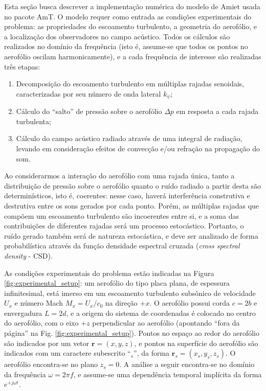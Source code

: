 \documentclass[a4paper, 11pt, twoside]{article}
\begin{document}
Esta seção busca descrever a implementação numérica do modelo de Amiet usada no pacote AmT. O modelo requer como entrada as condições experimentais do problema: as propriedades do escoamento turbulento, a geometria do aerofólio, e a localização dos observadores no campo acústico. Todos os cálculos são realizados no domínio da frequência (isto é, assume-se que todos os pontos no aerofólio oscilam harmonicamente), e a cada frequência de interesse são realizadas três etapas:

\begin{enumerate}
	\item Decomposição do escoamento turbulento em múltiplas rajadas senoidais, caracterizadas por seu número de onda lateral $k_\psi$;
	\item Cálculo do ``salto'' de pressão sobre o aerofólio $\Delta p$ em resposta a cada rajada turbulenta;
	\item Cálculo do campo acústico radiado através de uma integral de radiação, levando em consideração efeitos de convecção e/ou refração na propagação do som.
\end{enumerate}


Ao considerarmos a interação do aerofólio com uma rajada única, tanto a distribuição de pressão sobre o aerofólio quanto o ruído radiado a partir desta são determinísticos, isto é, coerentes: nesse caso, haverá interferência construtiva e destrutiva entre os sons gerados por cada ponto. Porém, as múltiplas rajadas que compõem um escoamento turbulento são incoerentes entre si, e a soma das contribuições de diferentes rajadas será um processo estocástico. Portanto, o ruído gerado também será de natureza estocástica, e deve ser analizado de forma probabilística através da função densidade espectral cruzada (\emph{cross spectral density} - CSD).

As condições experimentais do problema estão indicadas na Figura \ref{fig:experimental_setup}: um aerofólio do tipo placa plana, de espessura infinitesimal, está imerso em um escoamento turbulento subsônico de velocidade $U_x$ e número Mach $M_x = U_x/c_0$ na direção $+x$. O aerofólio possui corda $c=2b$ e envergadura $L=2d$, e a origem do sistema de coordenadas é colocado no centro do aerofólio, com o eixo $+z$ perpendicular ao aerofólio (apontando ``fora da página'' na Fig. \ref{fig:experimental_setup}). Pontos no espaço ao redor do aerofólio são indicados por um vetor $\mathbf{r}=(x, y, z)$, e pontos na superfície do aerofólio são indicados com um caractere subescrito ``$_s$'', da forma $\mathbf{r}_s = (x_s, y_s, z_s)$. O aerofólio encontra-se no plano $z_s = 0$. A análise a seguir encontra-se no domínio da frequência $\omega = 2 \pi f$, e assume-se uma dependência temporal implícita da forma $e^{+j \omega t}$.
\end{document}
